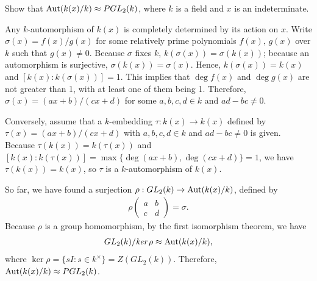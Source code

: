 \begin{prob}
    Show that ${\textrm{Aut}({k(x)/k})}\approx PGL_2(k)$, where $k$ is a field and $x$ is an indeterminate.
\end{prob}
\begin{sol}
    Any $k$-automorphism of $k(x)$ is completely determined by its action on $x$.
    Write $\sigma(x)=f(x)/g(x)$ for some relatively prime polynomials $f(x),\,g(x)$ over $k$ such that $g(x)\neq 0$.
    Because $\sigma$ fixes $k$, $k(\sigma(x))=\sigma(k(x))$; because an automorphism is surjective, $\sigma(k(x))=\sigma(x)$.
    Hence, $k(\sigma(x))=k(x)$ and $[k(x): k(\sigma(x))]=1$.
    This implies that $\deg f(x)$ and $\deg g(x)$ are not greater than 1, with at least one of them being 1.
    Therefore, $\sigma(x)=(ax+b)/(cx+d)$ for some $a, b, c, d\in k$ and $ad-bc\neq 0$.
    
    Conversely, assume that a $k$-embedding $\tau: k(x)\rightarrow k(x)$ defined by $\tau(x)=(ax+b)/(cx+d)$ with $a, b, c, d\in k$ and $ad-bc\neq 0$ is given.
    Because $\tau(k(x))=k(\tau(x))$ and $[k(x): k(\tau(x))]=\max\{\deg(ax+b), \deg(cx+d)\}=1$, we have $\tau(k(x))=k(x)$, so $\tau$ is a $k$-automorphism of $k(x)$.

    So far, we have found a surjection $\rho: GL_2(k)\rightarrow {\textrm{Aut}({k(x)/k})}$, defined by
    \begin{align*}
        \rho\begin{pmatrix}
            a   &   b\\
            c   &   d
        \end{pmatrix}=\sigma.
    \end{align*}
    Because $\rho$ is a group homomorphism, by the first isomorphism theorem, we have
    \begin{align*}
        GL_2(k)/\textit{ker\,}\rho\approx{\textrm{Aut}({k(x)/k})},
    \end{align*}
    where $\ker\rho=\{sI: s\in k^\times\}=Z(GL_2(k))$.
    Therefore, ${\textrm{Aut}({k(x)/k})}\approx PGL_2(k)$.
\end{sol}
